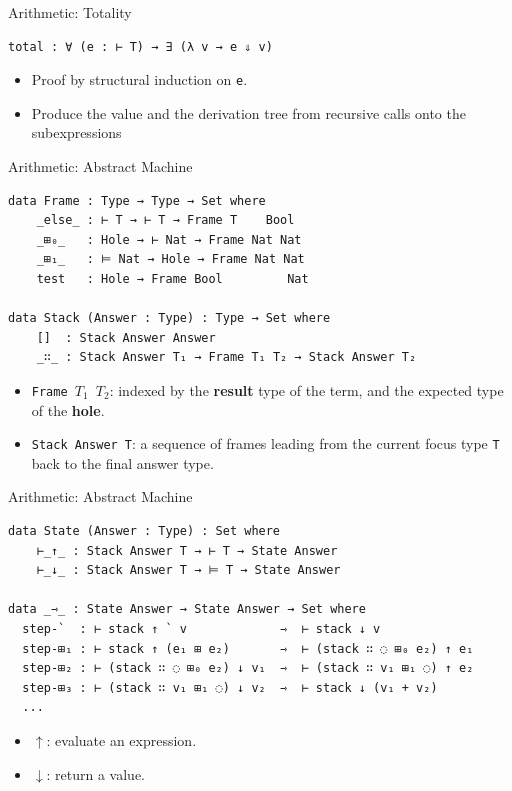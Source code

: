 \documentclass[10pt,compress,aspectratio=169]{beamer}
\begin{document}
\begin{frame}[fragile]{Arithmetic: Totality}
\begin{verbatim}
total : ∀ (e : ⊢ T) → ∃ (λ v → e ⇓ v)
\end{verbatim}
\begin{itemize}
    \item Proof by structural induction on \texttt{e}.
    \item Produce the value and the derivation tree from recursive calls onto the subexpressions
\end{itemize}
\end{frame}

\begin{frame}[fragile]{Arithmetic: Abstract Machine}
\begin{verbatim}
data Frame : Type → Type → Set where
    _𝚎𝚕𝚜𝚎_ : ⊢ T → ⊢ T → Frame T    Bool
    _⊞₀_   : Hole → ⊢ Nat → Frame Nat Nat
    _⊞₁_   : ⊨ Nat → Hole → Frame Nat Nat
    test   : Hole → Frame Bool         Nat

data Stack (Answer : Type) : Type → Set where
    []  : Stack Answer Answer
    _∷_ : Stack Answer T₁ → Frame T₁ T₂ → Stack Answer T₂
\end{verbatim}
\begin{itemize}
    \item \texttt{Frame $T_1$ $T_2$}: indexed by the \textbf{result} type of the term, and the expected type of the \textbf{hole}.
    \item \texttt{Stack Answer T}: a sequence of frames leading from the current focus type \texttt{T} back to the final answer type.
\end{itemize}
\end{frame}

\begin{frame}[fragile]{Arithmetic: Abstract Machine}
\begin{verbatim}
data State (Answer : Type) : Set where
    ⊢_↑_ : Stack Answer T → ⊢ T → State Answer
    ⊢_↓_ : Stack Answer T → ⊨ T → State Answer

data _⇾_ : State Answer → State Answer → Set where
  step-`  : ⊢ stack ↑ ` v             ⇾  ⊢ stack ↓ v
  step-⊞₁ : ⊢ stack ↑ (e₁ ⊞ e₂)       ⇾  ⊢ (stack ∷ ◌ ⊞₀ e₂) ↑ e₁
  step-⊞₂ : ⊢ (stack ∷ ◌ ⊞₀ e₂) ↓ v₁  ⇾  ⊢ (stack ∷ v₁ ⊞₁ ◌) ↑ e₂
  step-⊞₃ : ⊢ (stack ∷ v₁ ⊞₁ ◌) ↓ v₂  ⇾  ⊢ stack ↓ (v₁ + v₂)
  ...
\end{verbatim}
\begin{itemize}
    \item $\uparrow$: evaluate an expression.
    \item $\downarrow$: return a value.
\end{itemize}
\end{frame}
\end{document}
